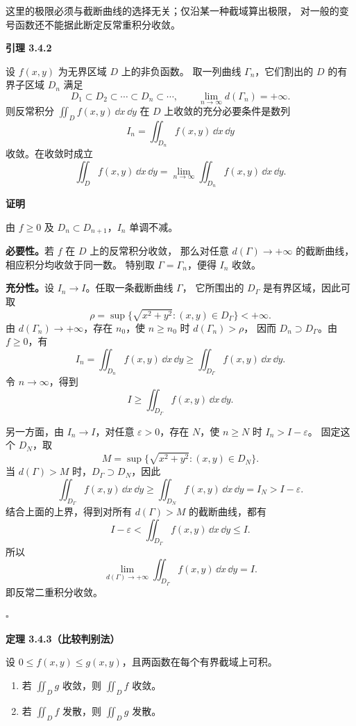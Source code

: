 这里的极限必须与截断曲线的选择无关；仅沿某一种截域算出极限，
对一般的变号函数还不能据此断定反常重积分收敛。



\textbf{引理 3.4.2}

设 $f(x,y)$ 为无界区域 $D$ 上的非负函数。
取一列曲线 $\Gamma_n$，它们割出的 $D$ 的有界子区域 $D_n$ 满足
\[
D_1\subset D_2\subset\cdots\subset D_n\subset\cdots,
\qquad\lim_{n\to\infty}d(\Gamma_n)=+\infty.
\]
则反常积分 $\displaystyle\iint_Df(x,y)\,\dd x\,\dd y$ 在 $D$ 上收敛的充分必要条件是数列
\[
I_n=\displaystyle\iint_{D_n}f(x,y)\,\dd x\,\dd y
\]
收敛。在收敛时成立
\[
\displaystyle\iint_Df(x,y)\,\dd x\,\dd y
=\lim_{n\to\infty}\displaystyle\iint_{D_n}f(x,y)\,\dd x\,\dd y.
\]





\textbf{证明}

由 $f\ge0$ 及 $D_n\subset D_{n+1}$，$I_n$ 单调不减。

\textbf{必要性。}若 $f$ 在 $D$ 上的反常积分收敛，
那么对任意 $d(\Gamma)\to+\infty$ 的截断曲线，相应积分均收敛于同一数。
特别取 $\Gamma=\Gamma_n$，便得 $I_n$ 收敛。

\textbf{充分性。}设 $I_n\to I$。任取一条截断曲线 $\Gamma$，
它所围出的 $D_\Gamma$ 是有界区域，因此可取
\[
\rho=\sup\{\sqrt{x^2+y^2}:(x,y)\in D_\Gamma\}<+\infty.
\]
由 $d(\Gamma_n)\to+\infty$，存在 $n_0$，使 $n\ge n_0$ 时 $d(\Gamma_n)>\rho$，
因而 $D_n\supset D_\Gamma$。由 $f\ge0$，有
\[
I_n=\displaystyle\iint_{D_n}f(x,y)\,\dd x\,\dd y
\ge\displaystyle\iint_{D_\Gamma}f(x,y)\,\dd x\,\dd y.
\]
令 $n\to\infty$，得到
\[
I\ge\displaystyle\iint_{D_\Gamma}f(x,y)\,\dd x\,\dd y.
\]

另一方面，由 $I_n\to I$，对任意 $\varepsilon>0$，存在 $N$，使 $n\ge N$ 时 $I_n>I-\varepsilon$。
固定这个 $D_N$，取
\[
M=\sup\{\sqrt{x^2+y^2}:(x,y)\in D_N\}.
\]
当 $d(\Gamma)>M$ 时，$D_\Gamma\supset D_N$，因此
\[
\displaystyle\iint_{D_\Gamma}f(x,y)\,\dd x\,\dd y
\ge\displaystyle\iint_{D_N}f(x,y)\,\dd x\,\dd y
=I_N>I-\varepsilon.
\]
结合上面的上界，得到对所有 $d(\Gamma)>M$ 的截断曲线，都有
\[
I-\varepsilon<\displaystyle\iint_{D_\Gamma}f(x,y)\,\dd x\,\dd y\le I.
\]
所以
\[
\lim_{d(\Gamma)\to+\infty}\displaystyle\iint_{D_\Gamma}f(x,y)\,\dd x\,\dd y=I.
\]
即反常二重积分收敛。


$\square$





\textbf{定理 3.4.3（比较判别法）}


设 $0\le f(x,y)\le g(x,y)$，且两函数在每个有界截域上可积。
\begin{enumerate}
\item 若 $\displaystyle\iint_Dg$ 收敛，则 $\displaystyle\iint_Df$ 收敛。
\item 若 $\displaystyle\iint_Df$ 发散，则 $\displaystyle\iint_Dg$ 发散。
\end{enumerate}





